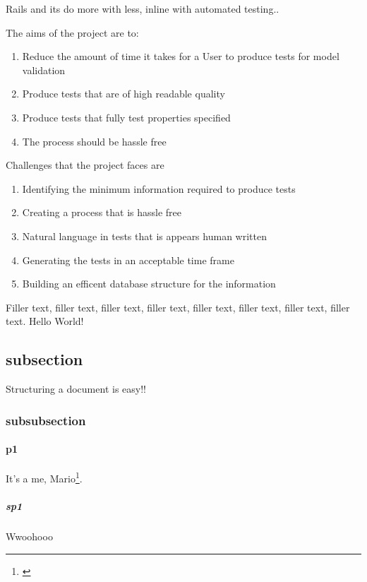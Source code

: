 \documentclass[a4paper,12pt]{article}
\begin{document}
\par Rails and its do more with less, inline with automated testing..

\par The aims of the project are to:
\begin{enumerate}
\item Reduce the amount of time it takes for a User to produce tests for model validation
\item Produce tests that are of high readable quality
\item Produce tests that fully test properties specified
\item The process should be hassle free
\end{enumerate}

\par Challenges that the project faces are
\begin{enumerate}
\item Identifying the minimum information required to produce tests
\item Creating a process that is hassle free
\item Natural language in tests that is appears human written
\item Generating the tests in an acceptable time frame
\item Building an efficent database structure for the information
\end{enumerate}

Filler text, filler text, filler text, filler text, filler text, filler text, filler text, filler text.
Hello World!
\subsection{subsection}
Structuring a document is easy!! \cite{near2012rubicon}
\subsubsection{subsubsection}
\paragraph{p1}
It's a me, Mario\footnote{\label{myfootnote}\cite{near2012rubicon}}.
\subparagraph{sp1}
Wwoohooo
\end{document}
